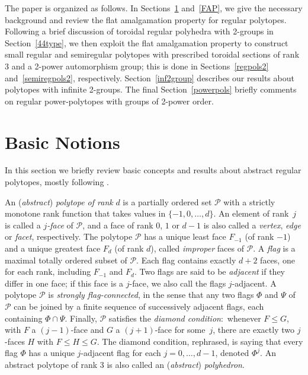 \documentclass[12pt]{amsart}
\theoremstyle{definition}
\begin{document}
The paper is organized as follows. In Sections~\ref{bano} and~\ref{FAP}, we give the necessary background and review the flat amalgamation property for regular polytopes. Following a brief discussion of toroidal regular polyhedra with 2-groups in Section~\ref{44type}, we then exploit the flat amalgamation property to construct small regular and semiregular polytopes with prescribed toroidal sections of rank 3 and a 2-power automorphism group; this is done in Sections~\ref{regpols2} and~\ref{semiregpols2}, respectively. Section~\ref{inf2group} describes our results about polytopes with infinite 2-groups. The final Section~\ref{powerpols} briefly comments on regular power-polytopes with groups of 2-power order.

\section{Basic Notions}
\label{bano}

In this section we briefly review basic concepts and results about abstract regular polytopes, mostly following \cite[Chs. 2,\,3]{McMSch2002}. 

An (\emph{abstract\/}) \textit{polytope of rank\/} $d$ is a partially ordered set $\mathcal{P}$ with a strictly monotone rank function that takes values in $\{-1,0, \ldots, d\}$. An element of rank~$j$ is called a \textit{$j$-face\/} of $\mathcal{P}$, and a face of rank $0$, $1$ or $d-1$ is also called a \textit{vertex\/}, \textit{edge\/} or \textit{facet\/}, respectively. The polytope $\mathcal{P}$ has a unique least face $F_{-1}$ (of rank $-1$) and a unique greatest face $F_d$ (of rank $d$), called \textit{improper\/} faces of $\mathcal{P}$. A \textit{flag\/} is a maximal totally ordered subset of $\mathcal{P}$. Each flag contains exactly $d+2$ faces, one for each rank, including $F_{-1}$ and $F_{d}$. Two flags are said to be \textit{adjacent} if they differ in one face; if this face is a $j$-face, we also call the flags $j$-adjacent. A polytope $\mathcal{P}$ is \textit{strongly flag-connected}, in the sense that any two flags $\Phi$ and $\Psi$ of $\mathcal{P}$ can be joined by a finite sequence of successively adjacent flags, each containing $\Phi \cap \Psi$. Finally, $\mathcal{P}$ satisfies the \textit{diamond condition\/}:\ whenever $F \leq G$, with $F$ a $(j-1)$-face and $G$ a $(j+1)$-face for some~$j$, there are exactly two $j$-faces $H$ with $F \leq H \leq G$. The diamond condition, rephrased, is saying that every flag $\Phi$ has a unique $j$-adjacent flag for each $j=0, \dots, d-1$, denoted $\Phi^j$.  An abstract polytope of rank 3 is also called an (\emph{abstract}) \emph{polyhedron}.
\end{document}
